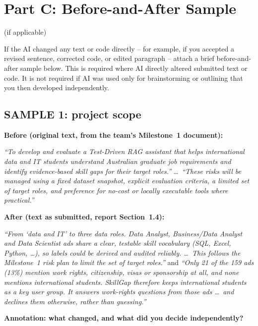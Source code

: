 \documentclass[manuscript,screen,nonacm]{acmart}
\begin{document}
\section*{Part C: Before-and-After Sample} (if applicable)
\begin{tcolorbox}[colback=blue!05,colframe=black,]
If the AI changed any text or code directly -- for example, if you accepted a revised sentence, corrected code, or edited paragraph -- attach a brief before-and-after sample below. This is required where AI directly altered submitted text or code. It is not required if AI was used only for brainstorming or outlining that you then developed independently.
\end{tcolorbox}

\subsection*{SAMPLE 1: project scope}

\noindent\textbf{Before (original text, from the team's Milestone~1 document):}

\vspace{0.5em}
\noindent\emph{``To develop and evaluate a Test-Driven RAG assistant that helps international data and IT students understand Australian graduate job requirements and identify evidence-based skill gaps for their target roles.''} \ldots\ \emph{``These risks will be managed using a fixed dataset snapshot, explicit evaluation criteria, a limited set of target roles, and preference for no-cost or locally executable tools where practical.''}

\vspace{1.5em}
\noindent\textbf{After (text as submitted, report Section~1.4):}

\vspace{0.5em}
\noindent\emph{``From `data and IT' to three data roles. Data Analyst, Business/Data Analyst and Data Scientist ads share a clear, testable skill vocabulary (SQL, Excel, Python, \ldots), so labels could be derived and audited reliably. \ldots\ This follows the Milestone~1 risk plan to limit the set of target roles.''} and \emph{``Only 21 of the 159 ads (13\%) mention work rights, citizenship, visas or sponsorship at all, and none mentions international students. SkillGap therefore keeps international students as a key user group. It answers work-rights questions from those ads \ldots\ and declines them otherwise, rather than guessing.''}

\vspace{1.5em}
\noindent\textbf{Annotation: what changed, and what did you decide independently?}
\end{document}
